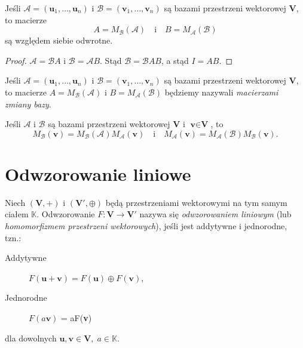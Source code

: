  	\begin{tw}
 		Jeśli  $\mathcal{A} =(\textbf{u}_1, \ldots, \textbf{u}_n)$ i  $\mathcal{B} =(\textbf{v}_1, \ldots, \textbf{v}_n)$ są bazami przestrzeni wektorowej \textbf{V}, to macierze
 		\begin{equation*}
 			A = M_{\mathcal{B}}(\mathcal{A}) \quad \text{i} \quad B = M_{\mathcal{A}}(\mathcal{B})
 		\end{equation*}
 		są względem siebie odwrotne.
 	\end{tw}
 	
 	\begin{proof}
 		$\mathcal{A} = \mathcal{B}A$ i $\mathcal{B} = \mathcal{A}B$. Stąd $\mathcal{B} = \mathcal{B}AB$, a stąd $I = AB$.
 	\end{proof}
 	
 	\begin{df}
	 	Jeśli  $\mathcal{A} =(\textbf{u}_1, \ldots, \textbf{u}_n)$ i  $\mathcal{B} =(\textbf{v}_1, \ldots, \textbf{v}_n)$ są bazami przestrzeni wektorowej \textbf{V}, to macierze $A = M_{\mathcal{B}}(\mathcal{A})$ i $B = M_{\mathcal{A}}(\mathcal{B})$ będziemy nazywali \textit{macierzami zmiany bazy}.
	 \end{df}
 	
 	\begin{tw}
 		Jeśli $\mathcal{A}$ i $\mathcal{B}$ są bazami przestrzeni wektorowej \textbf{V} i $\textbf{v} \in \textbf{V}$, to
 		\begin{equation*}
 			M_{\mathcal{B}}(\textbf{v}) = M_{\mathcal{B}}(\mathcal{A})M_{\mathcal{A}}(\textbf{v}) \quad \text{i} \quad
			M_{\mathcal{A}}(\textbf{v}) = M_{\mathcal{A}}(\mathcal{B})M_{\mathcal{B}}(\textbf{v}).
 		\end{equation*}
 	\end{tw}
	 	

 	\section{Odwzorowanie liniowe}
 	\begin{df} Niech  $(\textbf{V}, +)$ i $(\textbf{V}', \oplus)$ będą przestrzeniami wektorowymi na tym samym ciałem $\mathbb{K}$. Odwzorowanie $F:\textbf{V} \to \textbf{V}'$ nazywa się \textit{odwzorowaniem liniowym} (lub \textit{homomorfizmem przestrzeni wektorowych}), jeśli jest addytywne i jednorodne, tzn.:
 		\begin{description}
 			\item[Addytywne] $F(\textbf{u} +  \textbf{v}) = F(\textbf{u}) \oplus F(\textbf{v})$,
 			\item[Jednorodne] $F(a\textbf{v})$ = aF(\textbf{v})
		\end{description} 		
		dla dowolnych $\textbf{u},\textbf{v} \in \textbf{V}, \; a \in \mathbb{K}$.
 	\end{df}
 	
